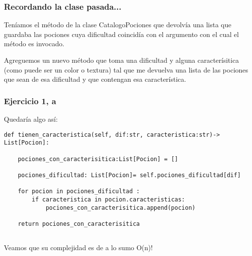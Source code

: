 \newcommand{\docente}{Prof. Camila Di Ielsi}

\usepackage{enumitem}


\begin{frame}
\titlepage
\end{frame}

\begin{frame}[fragile]\frametitle{Recordando la clase pasada...}

Ten\'iamos el m\'etodo  de la clase CatalogoPociones que devolv\'ia una lista que guardaba las pociones cuya dificultad coincid\'ia con el argumento con el cual el m\'etodo es invocado.\bigskip

Agreguemos un nuevo m\'etodo que toma una dificultad y alguna caracter\'isitica (como puede ser un color o textura) tal que me devuelva una lista de las pociones que sean de esa dificultad y que contengan esa caracter\'istica.


	
\end{frame}



\begin{frame}[fragile]\frametitle{Ejercicio 1, a}

Quedar\'ia algo as\'i:
\begin{lstlisting}[style=python,numbers=none,basicstyle=\ttfamily\tiny]
def tienen_caracteristica(self, dif:str, caracteristica:str)-> List[Pocion]:

    pociones_con_caracterisitica:List[Pocion] = []
    
    pociones_dificultad: List[Pocion]= self.pociones_dificultad[dif]
    
    for pocion in pociones_dificultad :
        if caracteristica in pocion.caracteristicas:
            pociones_con_caracterisitica.append(pocion)

    return pociones_con_caracterisitica
	
\end{lstlisting}

Veamos que su complejidad es de a lo sumo O(n)!

\end{frame}

